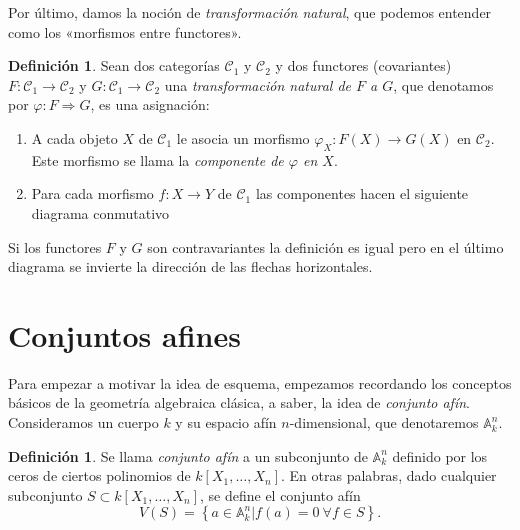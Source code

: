 \documentclass[12pt,a4paper]{article}
\theoremstyle{definition} \newtheorem{defn}[thm]{Definición}
\theoremstyle{definition} \newtheorem{ejemplo}[thm]{Ejemplo}
\theoremstyle{definition} \newtheorem{ejercicio}[thm]{Ejercicio}
\theoremstyle{remark} \newtheorem*{obs}{Observación}
\def\CC{\mathscr{C}}
\def\AA{\mathbb{A}}
\begin{document}
Por último, damos la noción de \emph{transformación natural}, que podemos entender como los «morfismos entre functores».
\begin{defn}
  Sean dos categorías $\CC_1$ y $\CC_2$ y dos functores (covariantes) $F:\CC_1\rightarrow \CC_2$ y $G:\CC_1\rightarrow \CC_2$ una \emph{transformación natural de $F$ a $G$}, que denotamos por $\varphi:F\Rightarrow G$, es una asignación:
  \begin{enumerate}
    \item A cada objeto $X$ de $\CC_1$ le asocia un morfismo $\varphi_X:F(X) \rightarrow G(X)$ en $\CC_2$. Este morfismo se llama la \emph{componente de $\varphi$ en $X$}.
    \item Para cada morfismo $f:X\rightarrow Y$ de $\CC_1$ las componentes hacen el siguiente diagrama conmutativo
      \begin{center}
       \end{center}
  \end{enumerate}
  Si los functores $F$ y $G$ son contravariantes la definición es igual pero en el último diagrama se invierte la dirección de las flechas horizontales.
\end{defn}
  

\section{Conjuntos afines}
Para empezar a motivar la idea de esquema, empezamos recordando los conceptos básicos de la geometría algebraica clásica, a saber, la idea de \emph{conjunto afín}. Consideramos un cuerpo $k$ y su espacio afín $n$-dimensional, que denotaremos $\AA_k^n$.
\begin{defn}
  Se llama \emph{conjunto afín} a un subconjunto de $\AA_k^n$ definido por los ceros de ciertos polinomios de $k[X_1,\dots,X_n]$. En otras palabras, dado cualquier subconjunto $S\subset k[X_1,\dots,X_n]$, se define el conjunto afín
  \begin{equation*}
    V(S)=\left\{ a\in \AA_k^n \vert f(a)=0 \ \forall f\in S \right\}.
  \end{equation*}
\end{defn}
\end{document}
